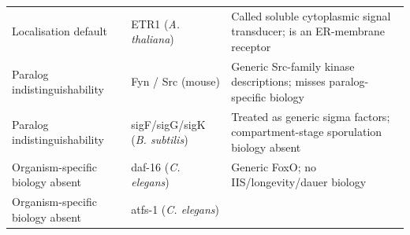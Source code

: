 \documentclass[
  11pt,
]{article}
\begin{document}
\begin{longtable}[]{@{}lll@{}}
\begin{minipage}[t]{0.30\columnwidth}
Localisation default\strut
\end{minipage} & \begin{minipage}[t]{0.30\columnwidth}\raggedright
ETR1 (\emph{A. thaliana})\strut
\end{minipage} & \begin{minipage}[t]{0.30\columnwidth}\raggedright
Called soluble cytoplasmic signal transducer; is an ER-membrane
receptor\strut
\end{minipage}\tabularnewline
\begin{minipage}[t]{0.30\columnwidth}\raggedright
Paralog indistinguishability\strut
\end{minipage} & \begin{minipage}[t]{0.30\columnwidth}\raggedright
Fyn / Src (mouse)\strut
\end{minipage} & \begin{minipage}[t]{0.30\columnwidth}\raggedright
Generic Src-family kinase descriptions; misses paralog-specific
biology\strut
\end{minipage}\tabularnewline
\begin{minipage}[t]{0.30\columnwidth}\raggedright
Paralog indistinguishability\strut
\end{minipage} & \begin{minipage}[t]{0.30\columnwidth}\raggedright
sigF/sigG/sigK (\emph{B. subtilis})\strut
\end{minipage} & \begin{minipage}[t]{0.30\columnwidth}\raggedright
Treated as generic sigma factors; compartment-stage sporulation biology
absent\strut
\end{minipage}\tabularnewline
\begin{minipage}[t]{0.30\columnwidth}\raggedright
Organism-specific biology absent\strut
\end{minipage} & \begin{minipage}[t]{0.30\columnwidth}\raggedright
daf-16 (\emph{C. elegans})\strut
\end{minipage} & \begin{minipage}[t]{0.30\columnwidth}\raggedright
Generic FoxO; no IIS/longevity/dauer biology\strut
\end{minipage}\tabularnewline
\begin{minipage}[t]{0.30\columnwidth}\raggedright
Organism-specific biology absent\strut
\end{minipage} & \begin{minipage}[t]{0.30\columnwidth}\raggedright
atfs-1 (\emph{C. elegans})\strut
\end{minipage} & \begin{minipage}[t]{0.30\columnwidth}\raggedright

\end{minipage}
\end{longtable}
\end{document}
